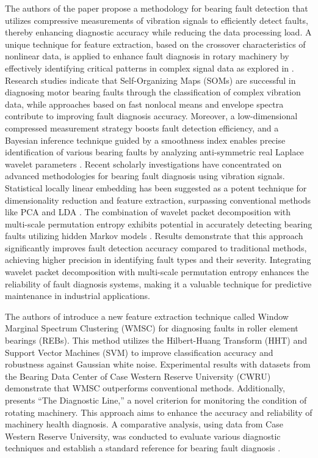 \documentclass[sn-basic,pdflatex]{sn-jnl}
\theoremstyle{remark}
\theoremstyle{definition}
\begin{document}
The authors of the paper \citep{WOS:000335959500009} propose a
methodology for bearing fault detection that utilizes compressive
measurements of vibration signals to efficiently detect faults, thereby
enhancing diagnostic accuracy while reducing the data processing load. A
unique technique for feature extraction, based on the crossover
characteristics of nonlinear data, is applied to enhance fault diagnosis
in rotary machinery by effectively identifying critical patterns in
complex signal data as explored in \citep{WOS:000338603900013}. Research
studies indicate that Self-Organizing Maps (SOMs) are successful in
diagnosing motor bearing faults through the classification of complex
vibration data, while approaches based on fast nonlocal means and
envelope spectra contribute to improving fault diagnosis accuracy.
Moreover, a low-dimensional compressed measurement strategy boosts fault
detection efficiency, and a Bayesian inference technique guided by a
smoothness index enables precise identification of various bearing
faults by analyzing anti-symmetric real Laplace wavelet parameters
\citep[@WOS:000348309400067, @WOS:000354607100016, @WOS:000350998800016]{WOS:000380543400119}.
Recent scholarly investigations have concentrated on advanced
methodologies for bearing fault diagnosis using vibration signals.
Statistical locally linear embedding has been suggested as a potent
technique for dimensionality reduction and feature extraction,
surpassing conventional methods like PCA and LDA
\citep{WOS:000361788200068}. The combination of wavelet packet
decomposition with multi-scale permutation entropy exhibits potential in
accurately detecting bearing faults utilizing hidden Markov models
\citep{WOS:000362513400031}. Results demonstrate that this approach
significantly improves fault detection accuracy compared to traditional
methods, achieving higher precision in identifying fault types and their
severity. Integrating wavelet packet decomposition with multi-scale
permutation entropy enhances the reliability of fault diagnosis systems,
making it a valuable technique for predictive maintenance in industrial
applications.

The authors of \citep{WOS:000365686400021} introduce a new feature
extraction technique called Window Marginal Spectrum Clustering (WMSC)
for diagnosing faults in roller element bearings (REBs). This method
utilizes the Hilbert-Huang Transform (HHT) and Support Vector Machines
(SVM) to improve classification accuracy and robustness against Gaussian
white noise. Experimental results with datasets from the Bearing Data
Center of Case Western Reserve University (CWRU) demonstrate that WMSC
outperforms conventional methods. Additionally,
\citep{WOS:000366534900022} presents ``The Diagnostic Line,'' a novel
criterion for monitoring the condition of rotating machinery. This
approach aims to enhance the accuracy and reliability of machinery
health diagnosis. A comparative analysis, using data from Case Western
Reserve University, was conducted to evaluate various diagnostic
techniques and establish a standard reference for bearing fault
diagnosis \citep{WOS:000357230900007}.
\end{document}
